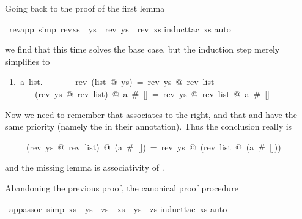\begin{isabellebody}
\begin{isamarkuptext}
Going back to the proof of the first lemma%
\end{isamarkuptext}%
\ rev{\isacharunderscore}app\ {\isacharbrackleft}simp{\isacharbrackright}{\isacharcolon}\ {\isachardoublequote}rev{\isacharparenleft}xs\ {\isacharat}\ ys{\isacharparenright}\ {\isacharequal}\ {\isacharparenleft}rev\ ys{\isacharparenright}\ {\isacharat}\ {\isacharparenleft}rev\ xs{\isacharparenright}{\isachardoublequote}\isanewline
{}induct{\isacharunderscore}tac\ xs{\isacharparenright}\isanewline
{}auto{\isacharparenright}%
\begin{isamarkuptxt}%
\noindent
we find that this time  solves the base case, but the
induction step merely simplifies to
\begin{isabelle}
~1.~{\isasymAnd}a~list.\isanewline
~~~~~~~rev~(list~@~ys)~=~rev~ys~@~rev~list~{\isasymLongrightarrow}\isanewline
~~~~~~~(rev~ys~@~rev~list)~@~a~\#~[]~=~rev~ys~@~rev~list~@~a~\#~[]
\end{isabelle}
Now we need to remember that \isa{{\isacharat}} associates to the right, and that
\isa{{\isacharhash}} and \isa{{\isacharat}} have the same priority (namely the 
in their  annotation). Thus the conclusion really is
\begin{isabelle}
~~~~~(rev~ys~@~rev~list)~@~(a~\#~[])~=~rev~ys~@~(rev~list~@~(a~\#~[]))
\end{isabelle}
and the missing lemma is associativity of \isa{{\isacharat}}.%
\end{isamarkuptxt}%
%
%
\begin{isamarkuptext}%
Abandoning the previous proof, the canonical proof procedure%
\end{isamarkuptext}%
\ app{\isacharunderscore}assoc\ {\isacharbrackleft}simp{\isacharbrackright}{\isacharcolon}\ {\isachardoublequote}{\isacharparenleft}xs\ {\isacharat}\ ys{\isacharparenright}\ {\isacharat}\ zs\ {\isacharequal}\ xs\ {\isacharat}\ {\isacharparenleft}ys\ {\isacharat}\ zs{\isacharparenright}{\isachardoublequote}\isanewline
{}induct{\isacharunderscore}tac\ xs{\isacharparenright}\isanewline
{}auto{\isacharparenright}%
\begin{isamarkuptext}%

\end{isamarkuptext}
\end{isabellebody}
